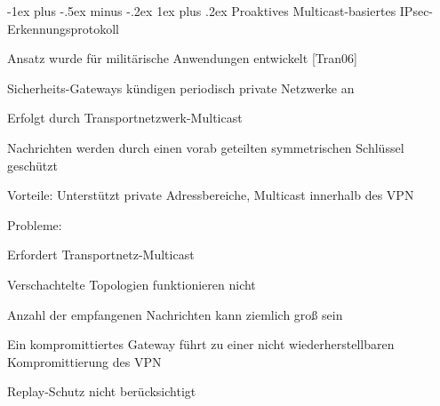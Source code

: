 \documentclass[a4paper]{article}
\makeatletter
\renewcommand{\subsubsection}{\@startsection{subsubsection}{3}{0mm}%
 {-1ex plus -.5ex minus -.2ex}%
 {1ex plus .2ex}%
 {\normalfont\small\bfseries}}
\makeatother
\begin{document}
\begin{multicols}{3}
\begin{itemize*}
            \subsubsection{Proaktives Multicast-basiertes
                  IPsec-Erkennungsprotokoll}
            \begin{itemize*}
                  \item       Ansatz wurde für militärische Anwendungen entwickelt {[}Tran06{]}
                  \item       Sicherheits-Gateways kündigen periodisch private Netzwerke an
                  \item       Erfolgt durch Transportnetzwerk-Multicast
                  \item       Nachrichten werden durch einen vorab geteilten symmetrischen Schlüssel
                  geschützt
                  \item       Vorteile: Unterstützt private Adressbereiche, Multicast innerhalb des
                  VPN
                  \item       Probleme:
                  \begin{itemize*}
                        \item Erfordert Transportnetz-Multicast
                        \item Verschachtelte Topologien funktionieren nicht
                        \item Anzahl der empfangenen Nachrichten kann ziemlich groß sein
                        \item Ein kompromittiertes Gateway führt zu einer nicht wiederherstellbaren Kompromittierung des VPN
                        \item Replay-Schutz nicht berücksichtigt
                  \end{itemize*}
            \end{itemize*}


\end{itemize*}
\end{multicols}
\end{document}
